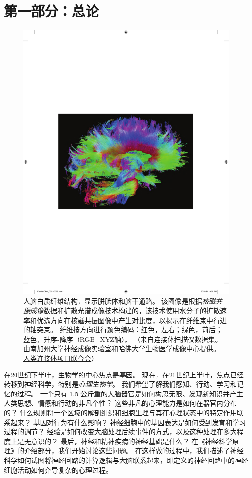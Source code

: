 \chapter*{第一部分：总论}

\begin{figure}[htbp]
	\centering
	\includegraphics[width=1.0\linewidth]{chap01/fig_1_0}
	\caption{人脑白质纤维结构，显示胼胝体和脑干通路。
		该图像是根据\textit{核磁共振成像}数据和扩散光谱成像技术构建的，该技术使用水分子的扩散速率和优选方向在核磁共振图像中产生对比度，以揭示在纤维束中行进的轴突束。
		纤维按方向进行颜色编码：红色，左右；绿色，前后；蓝色，升序-降序（RGB=XYZ轴）。
		（来自连接体扫描仪数据集。
		由南加州大学神经成像实验室和哈佛大学生物医学成像中心提供。
		\href{www.humanconnetomproject.org}{人类连接体项目联合会}）}
	\label{fig:1_0}
\end{figure}

在20世纪下半叶，生物学的中心焦点是基因。
现在，在21世纪上半叶，焦点已经转移到神经科学，特别是\textit{心理生物学}。
我们希望了解我们感知、行动、学习和记忆的过程。
一个只有 1.5 公斤重的大脑器官是如何构思无限、发现新知识并产生人类思想、情感和行动的非凡个性？
这些非凡的心理能力是如何在器官内分布的？
什么规则将一个区域的解剖组织和细胞生理与其在心理状态中的特定作用联系起来？
基因对行为有什么影响？
神经细胞中的基因表达是如何受到发育和学习过程的调节？
经验是如何改变大脑处理后续事件的方式，以及这种处理在多大程度上是无意识的？
最后，神经和精神疾病的神经基础是什么？
在《神经科学原理》的介绍部分，我们开始讨论这些问题。
在这样做的过程中，我们描述了神经科学如何试图将神经回路的计算逻辑与大脑联系起来，即定义的神经回路中的神经细胞活动如何介导复杂的心理过程。


